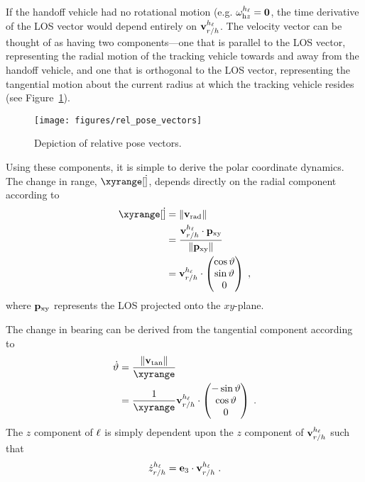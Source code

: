 If the handoff vehicle had no rotational motion (e.g. $\angvel_{\text{h}z}^\hv = \mathbf{0}$, the time derivative of the LOS vector would depend entirely on $\vel_{\TwrtH}^\hv$.
The velocity vector can be thought of as having two components---one that is parallel to the LOS vector, representing the radial motion of the tracking vehicle towards and away from the handoff vehicle, and one that is orthogonal to the LOS vector, representing the tangential motion about the current radius at which the tracking vehicle resides (see Figure~\ref{fig:rel_pose_vectors}).

\begin{figure}[hbt]
    \centering
    \texttt{[image: figures/rel\_pose\_vectors]}
    \caption{Depiction of relative pose vectors.}
    \label{fig:rel_pose_vectors}
\end{figure}

Using these components, it is simple to derive the polar coordinate dynamics.
The change in range, $\xyrange[\dot]$, depends directly on the radial component according to
\begin{align}
    \xyrange[\dot] &= \norm{\vel_\text{rad}} \\
        &= \frac{\vel_{\TwrtH}^\hv \cdot \pxy}{\norm{\pxy}} \label{eq:rhodot_projection} \\
        &= \vel_{\TwrtH}^\hv \cdot \begin{pmatrix} \cos\bearing \\ \sin\bearing \\ 0 \end{pmatrix} \;,
\end{align}
where $\pxy$ represents the LOS projected onto the $xy$-plane.

The change in bearing can be derived from the tangential component according to
\begin{align}
    \bearing[\dot] &= \frac{\norm{\vel_\text{tan}}}{\xyrange} \\
        &= \frac{1}{\xyrange} \vel_{\TwrtH}^\hv \cdot \begin{pmatrix} -\sin\bearing \\ \cos\bearing \\ 0 \end{pmatrix} \;.
\end{align}
The $z$ component of $\los$ is simply dependent upon the $z$ component of $\vel_{\TwrtH}^\hv$ such that
\begin{equation}
    \relzfull[\dot] = \e_3 \cdot \vel_{\TwrtH}^\hv \;.
\end{equation}

